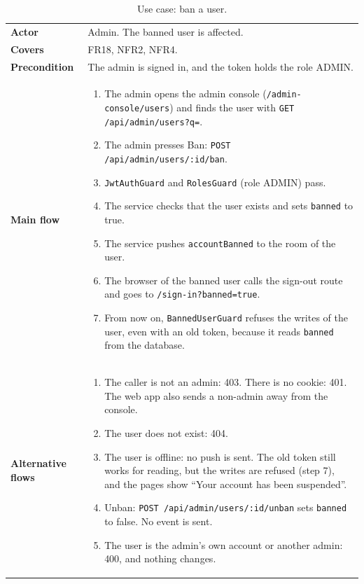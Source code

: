 {\small\singlespacing
\begin{longtable}{@{}>{\raggedright\arraybackslash}p{2.5cm} >{\raggedright\arraybackslash}p{\dimexpr\textwidth-2.5cm-2\tabcolsep\relax}@{}}
  \caption{Use case: ban a user.}
  \label{tab:design-uc-ban}\\
  \toprule
  \textbf{Actor} & Admin. The banned user is affected. \\
  \textbf{Covers} & FR18, NFR2, NFR4. \\
  \midrule
  \textbf{Precondition} & The admin is signed in, and the token holds the role ADMIN. \\
  \midrule
  \textbf{Main flow} &
  \begin{enumerate}[nosep,leftmargin=*,label=\arabic*.]
    \item The admin opens the admin console (\texttt{/admin-console/users}) and finds the user with \texttt{GET /api/admin/users?q=}.
    \item The admin presses Ban: \texttt{POST /api/admin/users/:id/ban}.
    \item \texttt{JwtAuthGuard} and \texttt{RolesGuard} (role ADMIN) pass.
    \item The service checks that the user exists and sets \texttt{banned} to true.
    \item The service pushes \texttt{accountBanned} to the room of the user.
    \item The browser of the banned user calls the sign-out route and goes to \texttt{/sign-in?banned=true}.
    \item From now on, \texttt{BannedUserGuard} refuses the writes of the user, even with an old token, because it reads \texttt{banned} from the database.
  \end{enumerate} \\
  \midrule
  \textbf{Alternative flows} &
  \begin{enumerate}[nosep,leftmargin=*,label=A\arabic*.]
    \item The caller is not an admin: 403. There is no cookie: 401. The web app also sends a non-admin away from the console.
    \item The user does not exist: 404.
    \item The user is offline: no push is sent. The old token still works for reading, but the writes are refused (step 7), and the pages show ``Your account has been suspended''.
    \item Unban: \texttt{POST /api/admin/users/:id/unban} sets \texttt{banned} to false. No event is sent.
    \item The user is the admin's own account or another admin: 400, and nothing changes.
  \end{enumerate} \\
  \bottomrule
\end{longtable}}

